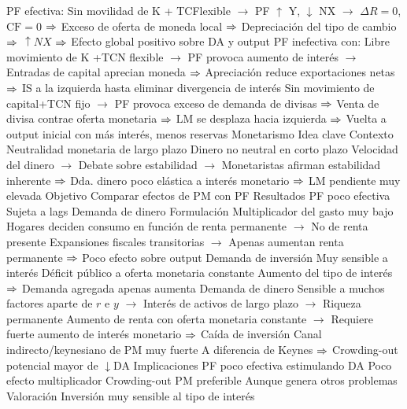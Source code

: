 \documentclass{nuevotema}
\begin{document}
\begin{esquemal}
				\4 PF efectiva: Sin movilidad de K +  TCFlexible
				\4[] $\to$ PF $\uparrow$ Y, $\downarrow$ NX
				\4[] $\to$ $\Delta R = 0$, $\text{CF} = 0$
				\4[] $\Rightarrow$ Exceso de oferta de moneda local
				\4[] $\Rightarrow$ Depreciación del tipo de cambio
				\4[] $\Rightarrow$ $\uparrow NX$
				\4[] $\Rightarrow$ Efecto global positivo sobre DA y output
				\4 PF inefectiva con:
				\4[] Libre movimiento de K +TCN flexible
				\4[] $\to$ PF provoca aumento de interés
				\4[] $\to$ Entradas de capital aprecian moneda
				\4[] $\Rightarrow$ Apreciación reduce exportaciones netas
				\4[] $\Rightarrow$ IS a la izquierda hasta eliminar divergencia de interés
				\4[] Sin movimiento de capital+TCN fijo
				\4[] $\to$ PF provoca exceso de demanda de divisas
				\4[] $\Rightarrow$ Venta de divisa contrae oferta monetaria
				\4[] $\Rightarrow$ LM se desplaza hacia izquierda
				\4[] $\Rightarrow$ Vuelta a output inicial con más interés, menos reservas
		\2 Monetarismo
			\3 Idea clave
				\4 Contexto
				\4[] Neutralidad monetaria de largo plazo
				\4[] Dinero no neutral en corto plazo
				\4[] Velocidad del dinero
				\4[] $\to$ Debate sobre estabilidad
				\4[] $\to$ Monetaristas afirman estabilidad inherente
				\4[] $\Rightarrow$ Dda. dinero poco elástica a interés monetario
				\4[] $\Rightarrow$ LM pendiente muy elevada
				\4 Objetivo
				\4[] Comparar efectos de PM con PF
				\4 Resultados
				\4[] PF poco efectiva
				\4[] Sujeta a lags
				\4[] Demanda de dinero
			\3 Formulación
				\4 Multiplicador del gasto muy bajo
				\4[] Hogares deciden consumo en función de renta permanente
				\4[] $\to$ No de renta presente
				\4[] Expansiones fiscales transitorias
				\4[] $\to$ Apenas aumentan renta permanente
				\4[] $\Rightarrow$ Poco efecto sobre output
				\4 Demanda de inversión
				\4[] Muy sensible a interés
				\4[] Déficit público a oferta monetaria constante
				\4[] Aumento del tipo de interés
				\4[] $\Rightarrow$ Demanda agregada apenas aumenta
				\4 Demanda de dinero
				\4[] Sensible a muchos factores aparte de $r$ e $y$
				\4[] $\to$ Interés de activos de largo plazo
				\4[] $\to$ Riqueza permanente
				\4[] Aumento de renta con oferta monetaria constante
				\4[] $\to$ Requiere fuerte aumento de interés monetario
				\4[] $\Rightarrow$ Caída de inversión
				\4 Canal indirecto/keynesiano de PM muy fuerte
				\4[] A diferencia de Keynes
				\4[] $\Rightarrow$ Crowding-out potencial mayor de $\downarrow$DA
			\3 Implicaciones
				\4 PF poco efectiva estimulando DA
				\4[] Poco efecto multiplicador
				\4[] Crowding-out
				\4 PM preferible
				\4[] Aunque genera otros problemas
			\3 Valoración
				\4 Inversión muy sensible al tipo de interés

\end{esquemal}
\end{document}
